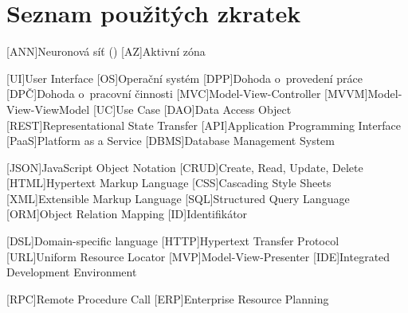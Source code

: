 \chapter*{Seznam použitých zkratek}
\begin{acronym}[TDMA]
[ANN]{Neuronová síť ()}
[AZ]{Aktivní zóna}

[UI]{User Interface}
[OS]{Operační systém}
[DPP]{Dohoda o~provedení práce}
[DPČ]{Dohoda o~pracovní činnosti}
[MVC]{Model-View-Controller}
[MVVM]{Model-View-ViewModel}
[UC]{Use Case}
[DAO]{Data Access Object}
[REST]{Representational State Transfer}
[API]{Application Programming Interface}
[PaaS]{Platform as a Service}
[DBMS]{Database Management System}

[JSON]{JavaScript Object Notation}
[CRUD]{Create, Read, Update, Delete}
[HTML]{Hypertext Markup Language}
[CSS]{Cascading Style Sheets}
[XML]{Extensible Markup Language}
[SQL]{Structured Query Language}
[ORM]{Object Relation Mapping}
[ID]{Identifikátor}

[DSL]{Domain-specific language}
[HTTP]{Hypertext Transfer Protocol}
[URL]{Uniform Resource Locator}
[MVP]{Model-View-Presenter}
[IDE]{Integrated Development Environment}

[RPC]{Remote Procedure Call}
[ERP]{Enterprise Resource Planning}
\end{acronym}
